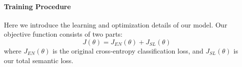 
\fi


\paragraph{Training Procedure}
Here we introduce the learning and optimization details of our model. Our objective function consists of two parts:
\begin{equation}
	J(\theta) = J_{EN}(\theta) + J_{SL}(\theta)
\end{equation}
where  $J_{EN}(\theta)$ is the original cross-entropy classification loss, and $J_{SL}(\theta)$ is our total semantic loss.


